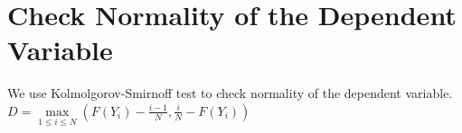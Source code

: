 \documentclass[11pt]{article}
\begin{document}
\section{Check Normality of the Dependent Variable}\label{Normality Check}
We use Kolmolgorov-Smirnoff test to check normality of the dependent variable.
$D=\underset{1 \leq i \leq N}{\max}(F(Y_i)-\frac{i-1}{N},\frac{i}{N}-F(Y_i))$



\end{document}
